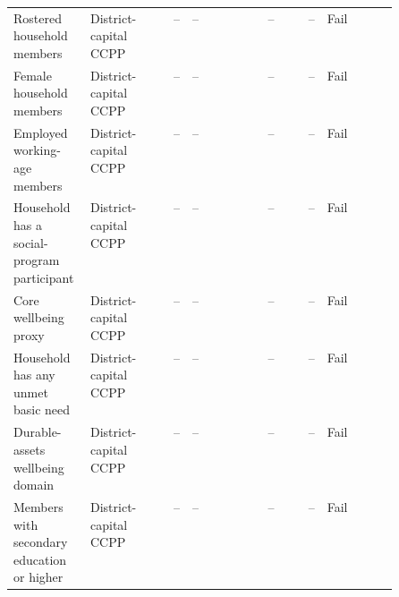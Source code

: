 \begin{longtable}{@{}p{0.20\linewidth}p{0.16\linewidth}rp{0.14\linewidth}rrl@{}}
Rostered household members & District-capital CCPP & -- & -- & -- & -- & Fail \\
Female household members & District-capital CCPP & -- & -- & -- & -- & Fail \\
Employed working-age members & District-capital CCPP & -- & -- & -- & -- & Fail \\
Household has a social-program participant & District-capital CCPP & -- & -- & -- & -- & Fail \\
Core wellbeing proxy & District-capital CCPP & -- & -- & -- & -- & Fail \\
Household has any unmet basic need & District-capital CCPP & -- & -- & -- & -- & Fail \\
Durable-assets wellbeing domain & District-capital CCPP & -- & -- & -- & -- & Fail \\
Members with secondary education or higher & District-capital CCPP & -- & -- & -- & -- & Fail \\
\end{longtable}
\endgroup
